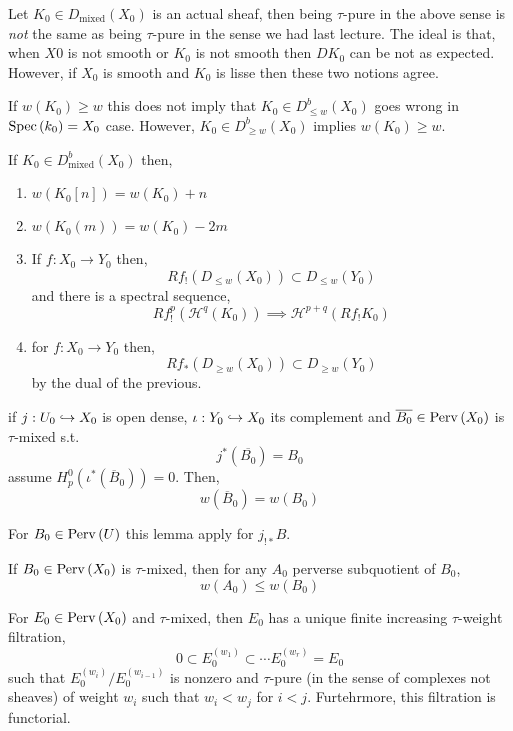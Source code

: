 \documentclass[12pt]{article}
\begin{document}
\begin{rmk}
Let $K_0 \in D_{\mathrm{mixed}}(X_0)$ is an actual sheaf, then being $\tau$-pure in the above sense is \textit{not} the same as being $\tau$-pure in the sense we had last lecture. The ideal is that, when $X0$ is not smooth or $K_0$ is not smooth then $D K_0$ can be not as expected. However, if $X_0$ is smooth and $K_0$ is lisse then these two notions agree.
\end{rmk}

\begin{rmk}
If $w(K_0) \ge w$ this does not imply that $K_0 \in D^b_{\le w}(X_0)$ goes wrong in $\mathrm{Spec}\left( k_0 \right) = X_0$ case. However, $K_0 \in D^b_{\ge w}(X_0)$ implies $w(K_0) \ge w$.
\end{rmk}

\begin{prop}
If $K_0 \in D^b_{\text{mixed}}(X_0)$ then,
\begin{enumerate}
\item $w(K_0[n]) = w(K_0) + n$
\item $w(K_0(m)) = w(K_0) - 2m$
\item If $f : X_0 \to Y_0$ then,
\[ R f_!(D_{\le w}(X_0)) \subset D_{\le w}(Y_0) \]
and there is a spectral sequence,
\[ R f_!^p (\mathcal{H}^q(K_0)) \implies \mathcal{H}^{p+q}(R f_! K_0) \]
\item for $f : X_0 \to Y_0$ then,
\[ R f_* (D_{\ge w}(X_0)) \subset D_{\ge w}(Y_0) \]
by the dual of the previous.
\end{enumerate}
\end{prop}

\begin{lemma}
if $j : U_0 \hookrightarrow X_0$ is open dense, $\iota : Y_0 \hookrightarrow X_0$ its complement and $\overline{B_0} \in \mathrm{Perv}\left( X_0 \right)$ is $\tau$-mixed s.t. 
\[ j^*(\overline{B_0}) = B_0 \]
assume $H_p^0(\iota^* (\overline{B}_0)) = 0$. Then,
\[ w(\overline{B}_0) = w(B_0) \]
\end{lemma}

\begin{rmk}
For $B_0 \in \mathrm{Perv}\left( U \right)$ this lemma apply for $j_{!*} B$.
\end{rmk}

\begin{lemma}
If $B_0 \in \mathrm{Perv}\left( X_0 \right)$ is $\tau$-mixed, then for any $A_0$ perverse subquotient of $B_0$,
\[ w(A_0) \le w(B_0) \]
\end{lemma}

\begin{lemma}
For $E_0 \in \mathrm{Perv}\left( X_0 \right)$ and $\tau$-mixed, then $E_0$ has a unique finite increasing $\tau$-weight filtration,
\[ 0 \subset E_0^{(w_1)} \subset \cdots E_0^{(w_r)} = E_0 \]
such that $E_0^{(w_i)}/E_0^{(w_{i-1})}$ is nonzero and $\tau$-pure (in the sense of complexes not sheaves) of weight $w_i$ such that $w_i < w_j$ for $i < j$. Furtehrmore, this filtration is functorial.
\end{lemma}
\end{document}

